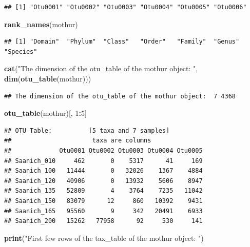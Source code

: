 \documentclass[11 pt,]{article}
\newenvironment{Shaded}{\begin{snugshade}}{\end{snugshade}}
\newcommand{\KeywordTok}[1]{\textcolor[rgb]{0.13,0.29,0.53}{\textbf{#1}}}
\newcommand{\DecValTok}[1]{\textcolor[rgb]{0.00,0.00,0.81}{#1}}
\newcommand{\StringTok}[1]{\textcolor[rgb]{0.31,0.60,0.02}{#1}}
\newcommand{\OperatorTok}[1]{\textcolor[rgb]{0.81,0.36,0.00}{\textbf{#1}}}
\newcommand{\NormalTok}[1]{#1}
\begin{document}
\begin{verbatim}
## [1] "Otu0001" "Otu0002" "Otu0003" "Otu0004" "Otu0005" "Otu0006"
\end{verbatim}

\begin{Shaded}
\begin{Highlighting}[]
\KeywordTok{rank_names}\NormalTok{(mothur)}
\end{Highlighting}
\end{Shaded}

\begin{verbatim}
## [1] "Domain"  "Phylum"  "Class"   "Order"   "Family"  "Genus"   "Species"
\end{verbatim}

\begin{Shaded}
\begin{Highlighting}[]
\KeywordTok{cat}\NormalTok{(}\StringTok{"The dimension of the otu_table of the mothur object: "}\NormalTok{, }\KeywordTok{dim}\NormalTok{(}\KeywordTok{otu_table}\NormalTok{(mothur)))}
\end{Highlighting}
\end{Shaded}

\begin{verbatim}
## The dimension of the otu_table of the mothur object:  7 4368
\end{verbatim}

\begin{Shaded}
\begin{Highlighting}[]
\KeywordTok{otu_table}\NormalTok{(mothur)[, }\DecValTok{1}\OperatorTok{:}\DecValTok{5}\NormalTok{]}
\end{Highlighting}
\end{Shaded}

\begin{verbatim}
## OTU Table:          [5 taxa and 7 samples]
##                      taxa are columns
##             Otu0001 Otu0002 Otu0003 Otu0004 Otu0005
## Saanich_010     462       0    5317      41     169
## Saanich_100   11444       0   32026    1367    4884
## Saanich_120   40906       0   13932    5606    8947
## Saanich_135   52809       4    3764    7235   11042
## Saanich_150   83079      12     860   10392    9431
## Saanich_165   95560       9     342   20491    6933
## Saanich_200   15262   77958      92     530     141
\end{verbatim}

\begin{Shaded}
\begin{Highlighting}[]
\KeywordTok{print}\NormalTok{(}\StringTok{"First few rows of the tax_table of the mothur object: "}\NormalTok{)}
\end{Highlighting}
\end{Shaded}
\end{document}
